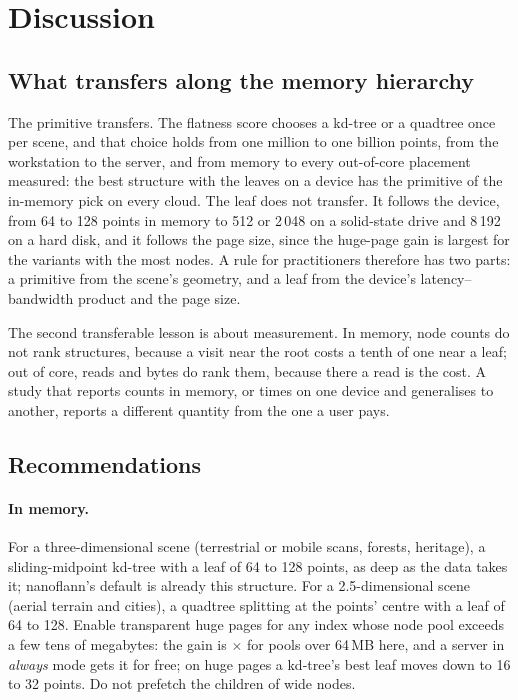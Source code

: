 \section{Discussion}\label{sec:discussion}

\subsection{What transfers along the memory hierarchy}

The primitive transfers. The flatness score chooses a kd-tree or a quadtree once per scene, and that choice holds from one million to one billion points, from the workstation to the server, and from memory to every out-of-core placement measured: the best structure with the leaves on a device has the primitive of the in-memory pick on every cloud. The leaf does not transfer. It follows the device, from 64 to 128 points in memory to 512 or 2\,048 on a solid-state drive and 8\,192 on a hard disk, and it follows the page size, since the huge-page gain is largest for the variants with the most nodes. A rule for practitioners therefore has two parts: a primitive from the scene's geometry, and a leaf from the device's latency--bandwidth product and the page size.

The second transferable lesson is about measurement. In memory, node counts do not rank structures, because a visit near the root costs a tenth of one near a leaf; out of core, reads and bytes do rank them, because there a read is the cost. A study that reports counts in memory, or times on one device and generalises to another, reports a different quantity from the one a user pays.


\subsection{Recommendations}

\paragraph{In memory.} For a three-dimensional scene (terrestrial or mobile scans, forests, heritage), a sliding-midpoint kd-tree with a leaf of 64 to 128 points, as deep as the data takes it; nanoflann's default is already this structure. For a 2.5-dimensional scene (aerial terrain and cities), a quadtree splitting at the points' centre with a leaf of 64 to 128. Enable transparent huge pages for any index whose node pool exceeds a few tens of megabytes: the gain is \hugeBigPools$\times$ for pools over 64\,MB here, and a server in \emph{always} mode gets it for free; on huge pages a kd-tree's best leaf moves down to 16 to 32 points. Do not prefetch the children of wide nodes.

